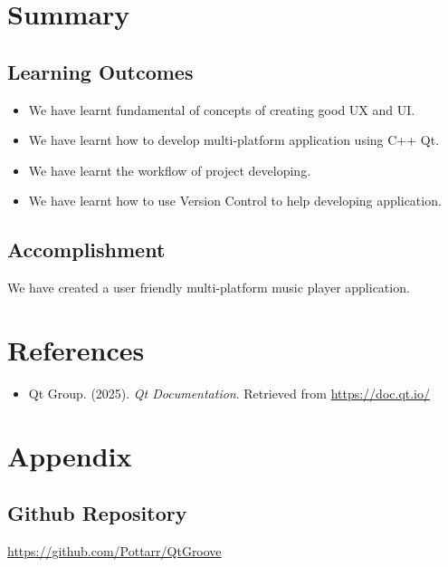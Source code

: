 \documentclass[12pt]{report} %
\begin{document}
\chapter{Summary}
\section{Learning Outcomes}
\begin{itemize}
    \item We have learnt fundamental of concepts of creating good UX and UI.
    \item We have learnt how to develop multi-platform application using C++ Qt.
    \item We have learnt the workflow of project developing.
    \item We have learnt how to use Version Control to help developing application.
\end{itemize}

\section{Accomplishment}
\hspace{1cm}We have created a user friendly multi-platform music player application.

\newpage

\chapter{References}
\begin{itemize}
    \item Qt Group. (2025). \textit{Qt Documentation}. Retrieved from \url{https://doc.qt.io/}
\end{itemize}

\newpage

\chapter{Appendix}

\section{Github Repository}
\url{https://github.com/Pottarr/QtGroove}
\end{document}
